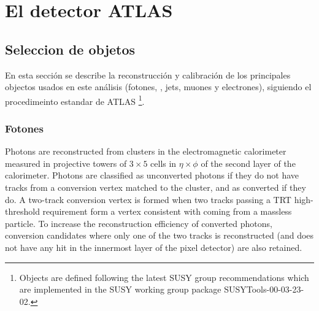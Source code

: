 \chapter{El detector ATLAS}


\section{Seleccion de objetos}
\label{sec:obj_selection}


En esta secci\'on se describe la reconstrucci\'on y calibraci\'on de los principales objectos usados en este an\'alisis
(fotones, \met, jets, muones y electrones), siguiendo el procedimeinto estandar de ATLAS \footnote{Objects are defined following the latest SUSY group
  recommendations which are implemented in the SUSY working group package SUSYTools-00-03-23-02.}.


\subsection{Fotones}
\label{sec:obj_photons}
Photons are reconstructed from clusters in the electromagnetic calorimeter measured in
projective towers of $3\times5$ cells in $\eta\times\phi$ of the second layer of the calorimeter.
Photons are classified as unconverted
photons if they do not have tracks from a conversion vertex matched to the
cluster, and as converted if they do. A two-track conversion vertex is
formed when two tracks passing a TRT high-threshold requirement form a
vertex consistent with coming from a massless particle. To increase the reconstruction efficiency
of converted photons, conversion candidates where only one of the two tracks is reconstructed
(and does not have any hit in the innermost layer of the pixel detector) are also retained. %

